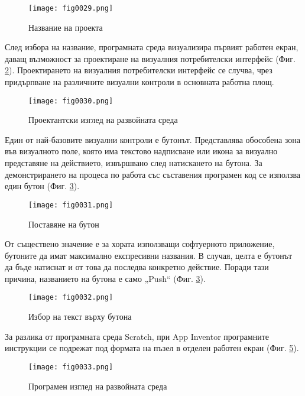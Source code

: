 \begin{figure}[H]
  \centering
  \texttt{[image: fig0029.png]}
  \caption{Название на проекта}
\label{fig0029}
\end{figure}

След избора на название, програмната среда визуализира първият работен екран, даващ възможност за проектиране на визуалния потребителски интерфейс (Фиг. \ref{fig0030}). Проектирането на визуалния потребителски интерфейс се случва, чрез придърпване на различните визуални контроли в основната работна площ. 

\begin{figure}[H]
  \centering
  \texttt{[image: fig0030.png]}
  \caption{Проектантски изглед на развойната среда}
\label{fig0030}
\end{figure}

Един от най-базовите визуални контроли е бутонът. Представлява обособена зона във визуалното поле, която има текстово надписване или икона за визуално представяне на действието, извършвано след натискането на бутона. За демонстрирането на процеса по работа със съставения програмен код се използва един бутон (Фиг. \ref{fig0031}).

\begin{figure}[H]
  \centering
  \texttt{[image: fig0031.png]}
  \caption{Поставяне на бутон}
\label{fig0031}
\end{figure}

От съществено значение е за хората използващи софтуерното приложение, бутоните да имат максимално експресивни названия. В случая, целта е бутонът да бъде натиснат и от това да последва конкретно действие. Поради тази причина, названието на бутона е само „Push“ (Фиг. \ref{fig0031}).

\begin{figure}[H]
  \centering
  \texttt{[image: fig0032.png]}
  \caption{Избор на текст върху бутона}
\label{fig0032}
\end{figure}

За разлика от програмната среда Scratch, при App Inventor програмните инструкции се подрежат под формата на пъзел в отделен работен екран (Фиг. \ref{fig0033}). 

\begin{figure}[H]
  \centering
  \texttt{[image: fig0033.png]}
  \caption{Програмен изглед на развойната среда}
\label{fig0033}
\end{figure}

